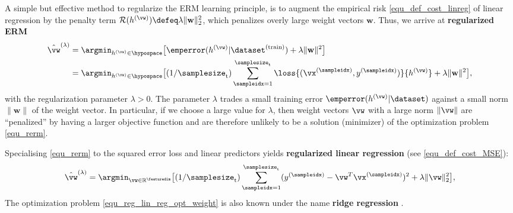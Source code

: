 \documentclass[12pt]{report}
\begin{document}
A simple but effective method to regularize the ERM learning principle, is to 
augment the empirical risk \eqref{equ_def_cost_linreg} of linear regression 
by the penalty term $\mathcal{R}(h^{(\vw)}) \defeq \lambda \| \mathbf{w} \|^{2}_{2}$, 
which penalizes overly large weight vectors $\mathbf{w}$. Thus, we arrive 
at {\bf regularized ERM}
\begin{align} 
\label{equ_rerm}
\hat{\vw}^{(\lambda)}  & = \argmin_{h^{(\vw)} \in  \hypospace} \big[ \emperror(h^{(\vw)}|\dataset^{(\rm train)})+ \lambda \| \mathbf{w} \|^{2} \big] \nonumber \\ %
&  = \argmin_{h^{(\vw)} \in  \hypospace} \big[(1/\samplesize_{\rm t}) \sum_{\sampleidx=1}^{\samplesize_{\rm t}} \loss{(\vx^{(\sampleidx)},y^{(\sampleidx)})}{h^{(\vw)}} + \lambda \| \mathbf{w} \|^{2} \big],
\end{align}
with the regularization parameter $\lambda >0$. The parameter $\lambda$ trades 
a small training error $\emperror(h^{(\vw)}|\dataset)$ against a small norm $\| \mathbf{w} \|$ 
of the weight vector. In particular, if we choose a large value for $\lambda$, then 
weight vectors $\vw$ with a large norm $\| \vw \|$ are ``penalized'' by having a larger 
objective function and are therefore unlikely to be a solution (minimizer) of the 
optimization problem \eqref{equ_rerm}. 

Specialising \eqref{equ_rerm} to the squared error loss and linear predictors 
yields {\bf regularized linear regression} (see \eqref{equ_def_cost_MSE}): 
\begin{equation} 
\label{equ_reg_lin_reg_opt_weight}
\hat{\vw}^{(\lambda)} = \argmin_{\vw \in \mathbb{R}^{\featuredim}} \big[ (1/\samplesize_{\rm t}) \sum_{\sampleidx=1}^{\samplesize_{\rm t}}  (y^{(\sampleidx)} - \vw^{T}\vx^{(\sampleidx)}  )^2 + \lambda \| \vw \|^{2}_{2}\big], 
\end{equation} 
The optimization problem \eqref{equ_reg_lin_reg_opt_weight} is also known 
under the name {\bf ridge regression} \cite{hastie01statisticallearning}. 

\end{document}
